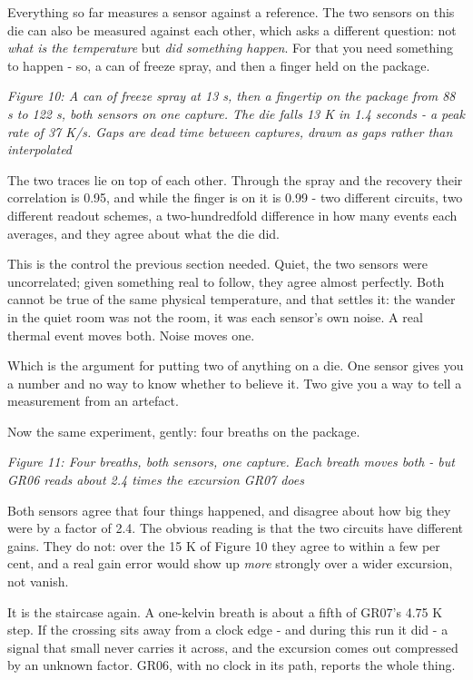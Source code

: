 Everything so far measures a sensor against a reference. The two sensors
on this die can also be measured against each other, which asks a
different question: not \emph{what is the temperature} but \emph{did
something happen}. For that you need something to happen - so, a can of
freeze spray, and then a finger held on the package.


{
\centering
{}
}

\emph{Figure 10: A can of freeze spray at 13 s, then a fingertip on the
package from 88 s to 122 s, both sensors on one capture. The die falls
13 K in 1.4 seconds - a peak rate of 37 K/s. Gaps are dead time between
captures, drawn as gaps rather than interpolated}

The two traces lie on top of each other. Through the spray and the
recovery their correlation is 0.95, and while the finger is on it is
0.99 - two different circuits, two different readout schemes, a
two-hundredfold difference in how many events each averages, and they
agree about what the die did.

This is the control the previous section needed. Quiet, the two sensors
were uncorrelated; given something real to follow, they agree almost
perfectly. Both cannot be true of the same physical temperature, and
that settles it: the wander in the quiet room was not the room, it was
each sensor's own noise. A real thermal event moves both. Noise moves
one.

Which is the argument for putting two of anything on a die. One sensor
gives you a number and no way to know whether to believe it. Two give
you a way to tell a measurement from an artefact.

Now the same experiment, gently: four breaths on the package.


{
\centering
{}
}

\emph{Figure 11: Four breaths, both sensors, one capture. Each breath
moves both - but GR06 reads about 2.4 times the excursion GR07 does}

Both sensors agree that four things happened, and disagree about how big
they were by a factor of 2.4. The obvious reading is that the two
circuits have different gains. They do not: over the 15 K of Figure 10
they agree to within a few per cent, and a real gain error would show up
\emph{more} strongly over a wider excursion, not vanish.

It is the staircase again. A one-kelvin breath is about a fifth of
GR07's 4.75 K step. If the crossing sits away from a clock edge - and
during this run it did - a signal that small never carries it across,
and the excursion comes out compressed by an unknown factor. GR06, with
no clock in its path, reports the whole thing.

